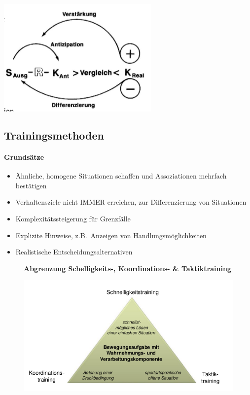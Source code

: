   \begin{minipage}{.5\textwidth}
    \includegraphics[width=\textwidth]{pictures/taktik_avk.png}
  \end{minipage}

\subsection{Trainingsmethoden}
\paragraph{Grundsätze}
\begin{itemize}
  \item Ähnliche, homogene Situationen schaffen und Assoziationen mehrfach bestätigen
  \item Verhaltensziele nicht IMMER erreichen, zur Differenzierung von Situationen
  \item Komplexitätssteigerung für Grenzfälle
  \item Explizite Hinweise, z.B.\ Anzeigen von Handlungsmöglichkeiten
  \item Realistische Entscheidungsalternativen
\end{itemize}
\begin{figure}[H]
  \begin{flushleft}
    \textbf{Abgrenzung Schelligkeits-, Koordinations- \& Taktiktraining}\\
  \end{flushleft}
  \centering
  \includegraphics[width=.7\textwidth]{pictures/taktik_training_abgrenzung.png}
\end{figure}


